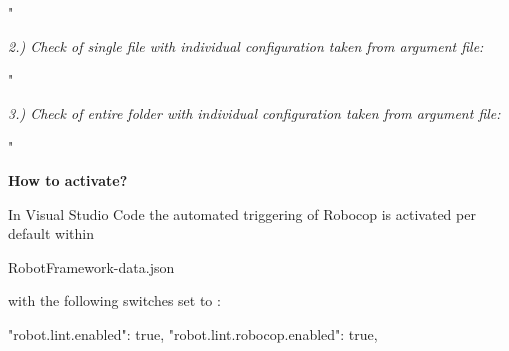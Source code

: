 \begin{robotlisting}
"%
\end{robotlisting}

\vspace{2ex}

\textit{2.) Check of single file with individual configuration taken from argument file:}

\begin{robotlisting}
"%
\end{robotlisting}

\vspace{2ex}

\textit{3.) Check of entire folder with individual configuration taken from argument file:}

\begin{robotlisting}
"%
\end{robotlisting}

\vspace{2ex}

\textbf{How to activate?}

In Visual Studio Code the automated triggering of Robocop is activated per default within

\begin{robotlog}
RobotFramework\robotvscode\data\user-data\User\settings.json
\end{robotlog}

with the following switches set to :

\begin{robotlisting}
"robot.lint.enabled": true,
"robot.lint.robocop.enabled": true,
\end{robotlisting}

